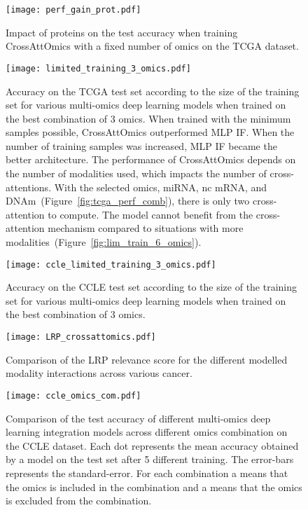 \begin{figure}[htbp]
     \centering
     \texttt{[image: perf\_gain\_prot.pdf]}
     \caption{Impact of proteins on the test accuracy when training CrossAttOmics with a fixed number of omics on the TCGA dataset.}\label{fig:perf_gain_prot}
 \end{figure}

 \begin{figure}[htbp]
     \centering
     \texttt{[image: limited\_training\_3\_omics.pdf]}
     \caption{Accuracy on the TCGA test set according to the size of the training set for various multi-omics deep learning models when trained on the best combination of 3 omics. When trained with the minimum samples possible, CrossAttOmics outperformed MLP IF\@. When the number of training samples was increased, MLP IF became the better architecture. The performance of CrossAttOmics depends on the number of modalities used, which impacts the number of cross-attentions. With the selected omics, miRNA, nc mRNA, and DNAm~(Figure~\ref{fig:tcga_perf_comb}), there is only two cross-attention to compute. The model cannot benefit from the cross-attention mechanism compared to situations with more modalities~(Figure~\ref{fig:lim_train_6_omics}).}\label{fig:lim_train_3_omics}
 \end{figure}



 \begin{figure}[htbp]
     \centering
     \texttt{[image: ccle\_limited\_training\_3\_omics.pdf]}
     \caption{Accuracy on the CCLE test set according to the size of the training set for various multi-omics deep learning models when trained on the best combination of 3 omics.}\label{fig:ccle_limited_train}
 \end{figure}

 \begin{figure}[htbp]
     \centering
     \texttt{[image: LRP\_crossattomics.pdf]}
     \caption{Comparison of the LRP relevance score for the different modelled modality interactions across various cancer.}\label{fig:LRP_CrossAttOmics}
 \end{figure}

 \begin{figure}[htbp]
     \centering
     \texttt{[image: ccle\_omics\_com.pdf]}
     \caption{Comparison of the test accuracy of different multi-omics deep learning integration models across different omics combination on the CCLE dataset. Each dot represents the mean accuracy obtained by a model on the test set after 5 different training. The error-bars represents the standard-error. For each combination a \cmark means that the omics is included in the combination and a \xmark means that the omics is excluded from the combination.}\label{fig:ccle_perf_comb}
 \end{figure}

